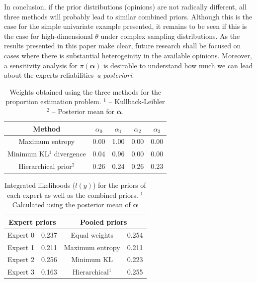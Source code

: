 \documentclass[a4paper, notitlepage, 11pt]{article}
\begin{document}
In conclusion, if the prior distributions (opinions) are not radically different, all three methods will probably lead to similar combined priors.
Although this is the case for the simple univariate example presented, it remains to be seen if this is the case for high-dimensional $\theta$ under complex sampling distributions.
As the results presented in this paper make clear, future research shall be focused on cases where there is substantial heterogeinity in the available opinions.
Moreover, a sensitivity analysis for $\pi(\boldsymbol\alpha)$ is desirable to understand how much we can lead about the experts reliabilities~\textit{a posteriori}.

\begin{table}[ht]
\caption{Weights obtained using the three methods for the proportion estimation problem. $^1$ -- Kullback-Leibler $^2$ -- Posterior mean for $\boldsymbol\alpha$.}
\centering
\begin{tabular}{ccccc}
  \hline
Method  & $\alpha_0$ & $\alpha_1$ & $\alpha_2$ & $\alpha_3$ \\ 
  \hline
Maximum entropy & 0.00 & 1.00 & 0.00 & 0.00 \\ 
Minimum KL$^1$ divergence& 0.04 & 0.96 & 0.00 & 0.00 \\ 
Hierarchical prior$^2$ & 0.26 & 0.24 & 0.26 & 0.23 \\ 
   \hline
\end{tabular}
\label{tab:alphasBeta}
\end{table}

\begin{table}[ht]
\caption{Integrated likelihoods ($l(y)$) for the priors of each expert as well as the combined priors.
$^1$ Calculated using the posterior mean of $\boldsymbol\alpha$}
\centering
\begin{tabular}{cccc}
   \hline
   \multicolumn{2}{c}{Expert priors} &  \multicolumn{2}{c}{Pooled priors} \\
   \hline
   Expert 0 & 0.237 & Equal weights & 0.254\\
   Expert 1 & 0.211 & Maximum entropy & 0.211 \\
   Expert 2 & 0.256 & Minimum KL & 0.223\\ 
   Expert 3 & 0.163 & Hierarchical$^1$ & 0.255 \\
   \hline
\end{tabular}
\label{tab:marglikes}
\end{table}
\end{document}
